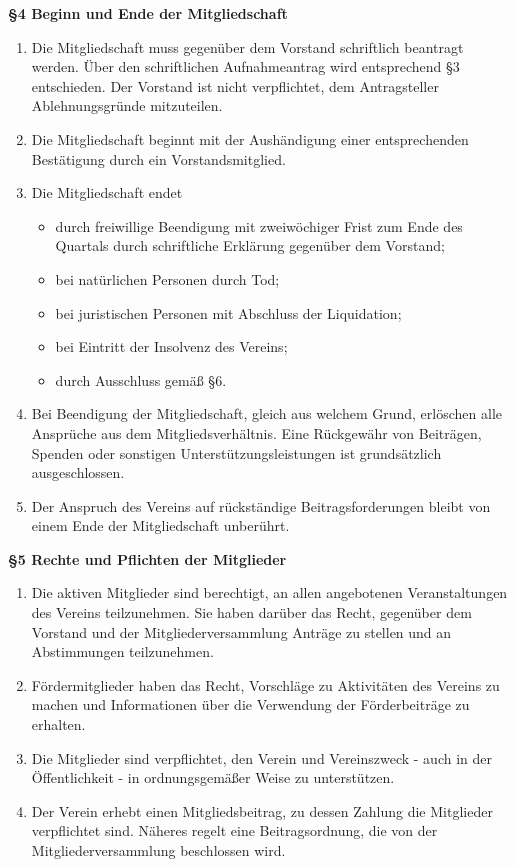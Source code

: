 \documentclass[a4paper,
               12pt,
               titlepage,
               parskip=half]{scrartcl}
\begin{document}
\vspace{1.0em}

\textbf{§4 Beginn und Ende der Mitgliedschaft}
{\small
	\begin{enumerate}
		\item Die Mitgliedschaft muss gegenüber dem Vorstand schriftlich beantragt werden. Über den schriftlichen Aufnahmeantrag wird entsprechend §3 entschieden. Der Vorstand ist nicht verpflichtet, dem Antragsteller Ablehnungsgründe mitzuteilen.
		\item Die Mitgliedschaft beginnt mit der Aushändigung einer entsprechenden Bestätigung durch ein Vorstandsmitglied.
		\item Die Mitgliedschaft endet
		\begin{itemize}
			\item durch freiwillige Beendigung mit zweiwöchiger Frist zum Ende des Quartals durch schriftliche Erklärung gegenüber dem Vorstand;
			\item bei natürlichen Personen durch Tod;
			\item bei juristischen Personen mit Abschluss der Liquidation;
			\item bei Eintritt der Insolvenz des Vereins;
			\item durch Ausschluss gemäß §6.
		\end{itemize}
		\item Bei Beendigung der Mitgliedschaft, gleich aus welchem Grund, erlöschen alle Ansprüche aus dem Mitgliedsverhältnis. Eine Rückgewähr von Beiträgen, Spenden oder sonstigen Unterstützungsleistungen ist grundsätzlich ausgeschlossen.
		\item Der Anspruch des Vereins auf rückständige Beitragsforderungen bleibt von einem Ende der Mitgliedschaft unberührt.
	\end{enumerate}
}

\vspace{1.0em}

\textbf{§5 Rechte und Pflichten der Mitglieder}
{\small
	\begin{enumerate}
		\item Die aktiven Mitglieder sind berechtigt, an allen angebotenen Veranstaltungen des Vereins teilzunehmen. Sie haben darüber das Recht, gegenüber dem Vorstand und der Mitgliederversammlung Anträge zu stellen und an Abstimmungen teilzunehmen.
		\item Fördermitglieder haben das Recht, Vorschläge zu Aktivitäten des Vereins zu machen und Informationen über die Verwendung der Förderbeiträge zu erhalten.
		\item Die Mitglieder sind verpflichtet, den Verein und Vereinszweck - auch in der Öffentlichkeit - in ordnungsgemäßer Weise zu unterstützen.
		\item Der Verein erhebt einen Mitgliedsbeitrag, zu dessen Zahlung die Mitglieder verpflichtet sind. Näheres regelt eine Beitragsordnung, die von der Mitgliederversammlung beschlossen wird.
	\end{enumerate}
}
\end{document}
